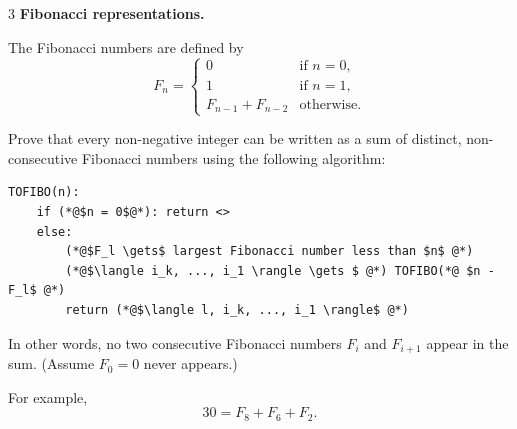 \documentclass[12pt]{article}
\begin{document}
\newpage 

\begin{problem}{3}
\textbf{Fibonacci representations.}  

    The Fibonacci numbers are defined by
    \[
    F_n =
    \begin{cases}
    0 & \text{if } n = 0, \\
    1 & \text{if } n = 1, \\
    F_{n-1} + F_{n-2} & \text{otherwise}.
    \end{cases}
    \]

    Prove that every non-negative integer can be written as a sum of distinct,
    non-consecutive Fibonacci numbers using the following algorithm:

    \begin{lstlisting}
TOFIBO(n):
    if (*@$n = 0$@*): return <>
    else:
        (*@$F_l \gets$ largest Fibonacci number less than $n$ @*)
        (*@$\langle i_k, ..., i_1 \rangle \gets $ @*) TOFIBO(*@ $n - F_l$ @*)
        return (*@$\langle l, i_k, ..., i_1 \rangle$ @*) 
    \end{lstlisting}

    In other words, no two consecutive Fibonacci numbers $F_i$ and $F_{i+1}$ appear in the sum.
    (Assume $F_0 = 0$ never appears.)

    For example,
    \[30 = F_8 + F_6 + F_2.\]
\end{problem}
\end{document}
